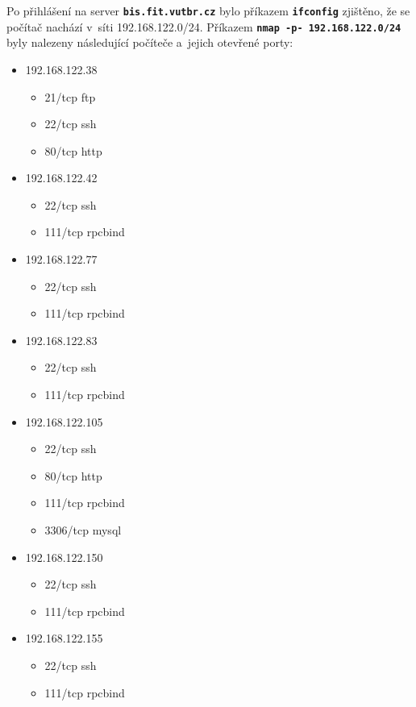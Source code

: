 \documentclass[a4paper, 10pt, twocolumn]{article}
\renewcommand{\tt}[1]{\texttt{\textbf{#1}}}
\begin{document}
	Po přihlášení na server \tt{bis.fit.vutbr.cz} bylo příkazem
	\tt{ifconfig} zjištěno, že se počítač nachází v~síti
	192.168.122.0/24. Příkazem \tt{nmap -p- 192.168.122.0/24}
	byly nalezeny následující počíteče a~jejich otevřené porty:
	\begin{itemize}
		\item
			192.168.122.38
			\begin{itemize}
				\item 21/tcp ftp
				\item 22/tcp ssh
				\item 80/tcp http
			\end{itemize}

		\item
			192.168.122.42
			\begin{itemize}
				\item 22/tcp ssh
				\item 111/tcp rpcbind
			\end{itemize}

		\item
			192.168.122.77
			\begin{itemize}
				\item 22/tcp ssh
				\item 111/tcp rpcbind
			\end{itemize}

		\item
			192.168.122.83
			\begin{itemize}
				\item 22/tcp ssh
				\item 111/tcp rpcbind
			\end{itemize}

		\item
			192.168.122.105
			\begin{itemize}
				\item 22/tcp ssh
				\item 80/tcp http
				\item 111/tcp rpcbind
				\item 3306/tcp mysql
			\end{itemize}

		\item
			192.168.122.150
			\begin{itemize}
				\item 22/tcp ssh
				\item 111/tcp rpcbind
			\end{itemize}

		\item
			192.168.122.155
			\begin{itemize}
				\item 22/tcp ssh
				\item 111/tcp rpcbind
			\end{itemize}


\end{itemize}
\end{document}
